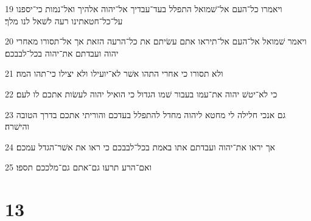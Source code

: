 \par 19 ויאמרו כל־העם אל־שׁמואל התפלל בעד־עבדיך אל־יהוה אלהיך ואל־נמות כי־יספנו על־כל־חטאתינו רעה לשׁאל לנו מלך׃
\par 20 ויאמר שׁמואל אל־העם אל־תיראו אתם עשׂיתם את כל־הרעה הזאת אך אל־תסורו מאחרי יהוה ועבדתם את־יהוה בכל־לבבכם׃
\par 21 ולא תסורו כי אחרי התהו אשׁר לא־יועילו ולא יצילו כי־תהו המה׃
\par 22 כי לא־יטשׁ יהוה את־עמו בעבור שׁמו הגדול כי הואיל יהוה לעשׂות אתכם לו לעם׃
\par 23 גם אנכי חלילה לי מחטא ליהוה מחדל להתפלל בעדכם והוריתי אתכם בדרך הטובה והישׁרה׃
\par 24 אך יראו את־יהוה ועבדתם אתו באמת בכל־לבבכם כי ראו את אשׁר־הגדל עמכם׃
\par 25 ואם־הרע תרעו גם־אתם גם־מלככם תספו׃

\chapter{13}

